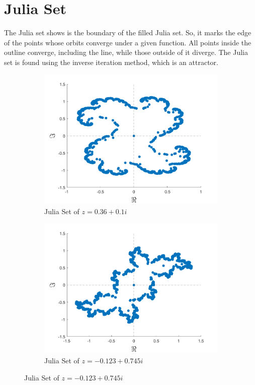 \documentclass[letterpaper,11pt]{article}
\begin{document}
\section{Julia Set}
The Julia set shows is the boundary of the filled Julia set. So, it marks the edge of the points whose orbits converge under a given function. All points inside the outline converge, including the line, while those outside of it diverge. The Julia set is found using the inverse iteration method, which is an attractor. 

\begin{figure}
\centering
	\begin{subfigure}[b]{0.49\linewidth}
		\includegraphics[width=\linewidth]{../Figures/Julia1.png}
		\caption{Julia Set of $z = 0.36 + 0.1i$}
		\label{fig:J+.36+.1i}
	\end{subfigure}
	\begin{subfigure}[b]{0.49\linewidth}
		\includegraphics[width=\linewidth]{../Figures/Julia2.png}
		\caption{Julia Set of $z = -0.123 + 0.745i$}
		\label{fig:J+.123+.745i}
	\end{subfigure}
	

\end{figure}
\end{document}
